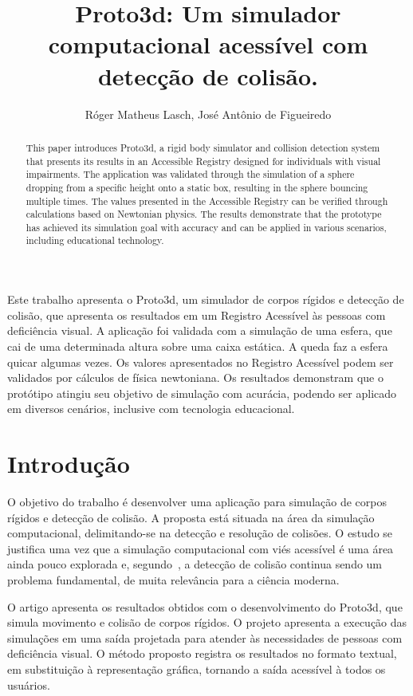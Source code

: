 \documentclass[12pt]{article}
\title{Proto3d: Um simulador computacional acessível com detecção de colisão.}
\author{Róger Matheus Lasch\inst{1}, José Antônio de Figueiredo\inst{1}}
\begin{document}
 

\maketitle

\begin{abstract}
This paper introduces Proto3d, a rigid body simulator and collision detection system that presents its results in an Accessible Registry designed for individuals with visual impairments. The application was validated through the simulation of a sphere dropping from a specific height onto a static box, resulting in the sphere bouncing multiple times. The values presented in the Accessible Registry can be verified through calculations based on Newtonian physics. The results demonstrate that the prototype has achieved its simulation goal with accuracy and can be applied in various scenarios, including educational technology.
\end{abstract}
     
\begin{resumo} 
Este trabalho apresenta o Proto3d, um simulador de corpos rígidos e detecção de colisão, que apresenta os resultados em um Registro Acessível às pessoas com deficiência visual. A aplicação foi validada com a simulação de uma esfera, que cai de uma determinada altura sobre uma caixa estática. A queda faz a esfera quicar algumas vezes. Os valores apresentados no Registro Acessível podem ser validados por cálculos de física newtoniana. Os resultados demonstram que o protótipo atingiu seu objetivo de simulação com acurácia, podendo ser aplicado em diversos cenários, inclusive com tecnologia educacional.
\end{resumo}

\section{Introdução}
O objetivo do trabalho é desenvolver uma aplicação para simulação de corpos rígidos e detecção de colisão. A proposta está situada na área da simulação computacional, delimitando-se na detecção e resolução de colisões. O estudo se justifica uma vez que a simulação computacional com viés acessível é uma área ainda pouco explorada e, segundo~\cite{ericson2004real}, a detecção de colisão continua sendo um problema fundamental, de muita relevância para a ciência moderna.

O artigo apresenta os resultados obtidos com o desenvolvimento do Proto3d, que simula movimento e colisão de corpos rígidos. O projeto apresenta a execução das simulações em uma saída projetada para atender às necessidades de pessoas com deficiência visual. O método proposto registra os resultados no formato textual, em substituição à representação gráfica, tornando a saída acessível à todos os usuários.
\end{document}
